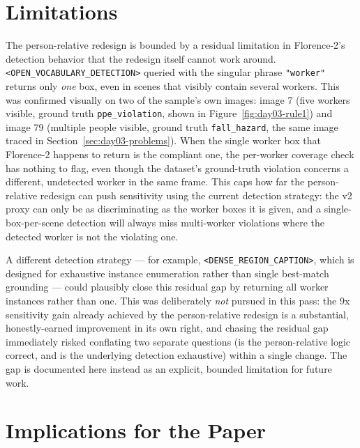 \section{Limitations}
\label{sec:day03-limitations}

The person-relative redesign is bounded by a residual limitation in Florence-2's detection behavior
that the redesign itself cannot work around. \texttt{<OPEN\_VOCABULARY\_DETECTION>} queried with the
singular phrase \texttt{"worker"} returns only \emph{one} box, even in scenes that visibly contain
several workers. This was confirmed visually on two of the sample's own images: image 7 (five
workers visible, ground truth \texttt{ppe\_violation}, shown in Figure~\ref{fig:day03-rule1}) and
image 79 (multiple people visible, ground truth \texttt{fall\_hazard}, the same image traced in
Section~\ref{sec:day03-problems}). When the single worker box that Florence-2 happens to return is
the compliant one, the per-worker coverage check has nothing to flag, even though the dataset's
ground-truth violation concerns a different, undetected worker in the same frame. This caps how far
the person-relative redesign can push sensitivity using the current detection strategy: the v2 proxy
can only be as discriminating as the worker boxes it is given, and a single-box-per-scene detection
will always miss multi-worker violations where the detected worker is not the violating one.

A different detection strategy --- for example, \texttt{<DENSE\_REGION\_CAPTION>}, which is designed
for exhaustive instance enumeration rather than single best-match grounding --- could plausibly
close this residual gap by returning all worker instances rather than one. This was deliberately
\emph{not} pursued in this pass: the 9x sensitivity gain already achieved by the person-relative
redesign is a substantial, honestly-earned improvement in its own right, and chasing the residual
gap immediately risked conflating two separate questions (is the person-relative logic correct, and
is the underlying detection exhaustive) within a single change. The gap is documented here instead
as an explicit, bounded limitation for future work.

\section{Implications for the Paper}

